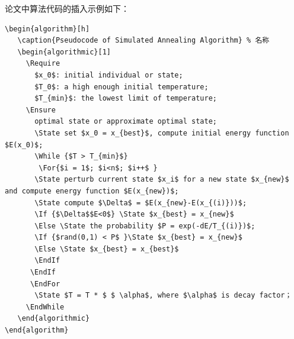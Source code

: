 论文中算法代码的插入示例如下：
\begin{lstlisting}[caption={算法代码的插入示例}]
\begin{algorithm}[h]  
   \caption{Pseudocode of Simulated Annealing Algorithm} % 名称 
   \begin{algorithmic}[1]   
     \Require      
       $x_0$: initial individual or state;     
       $T_0$: a high enough initial temperature;      
       $T_{min}$: the lowest limit of temperature;    
     \Ensure       
       optimal state or approximate optimal state;       
       \State set $x_0 = x_{best}$, compute initial energy function $E(x_0)$;       
       \While {$T > T_{min}$}        
        \For{$i = 1$; $i<n$; $i++$ }      
       \State perturb current state $x_i$ for a new state $x_{new}$ and compute energy function $E(x_{new})$;      
       \State compute $\Delta$ = $E(x_{new}-E(x_{(i)}))$;      
       \If {$\Delta$$E<0$} \State $x_{best} = x_{new}$      
       \Else \State the probability $P = exp(-dE/T_{(i)})$;      
       \If {$rand(0,1) < P$ }\State $x_{best} = x_{new}$      
       \Else \State $x_{best} = x_{best}$      
       \EndIf     
      \EndIf     
      \EndFor      
       \State $T = T * $ $ \alpha$, where $\alpha$ is decay factor；
     \EndWhile  
   \end{algorithmic}
\end{algorithm}
\end{lstlisting}

